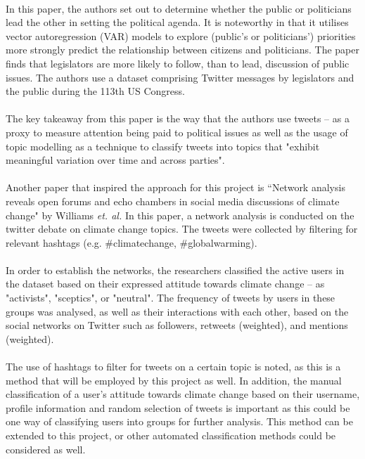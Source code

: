 \documentclass[10pt,twocolumn,letterpaper]{article}
\begin{document}
	\paragraph{} In this paper, the authors set out to determine whether the public or politicians lead the other in setting the political agenda. It is noteworthy in that it utilises vector autoregression (VAR) models to explore  (public's or politicians') priorities more strongly predict the relationship between citizens and politicians. The paper finds that legislators are more likely to follow, than to lead, discussion of public issues. The authors use a dataset comprising Twitter messages by legislators and the public during the 113th US Congress. 
	
	\paragraph{} The key takeaway from this paper is the way that the authors use tweets -- as a proxy to measure attention being paid to political issues as well as the usage of topic modelling as a technique to classify tweets into topics that "exhibit meaningful variation over time and across parties". 
	
	\paragraph{} Another paper that inspired the approach for this project is ``Network analysis reveals open forums and echo chambers in social media discussions of climate change" by Williams \emph{et. al.} \cite{WILLIAMS2015126} In this paper, a network analysis is conducted on the twitter debate on climate change topics. The tweets were collected by filtering for relevant hashtags (e.g. \#climatechange, \#globalwarming). 
	
	\paragraph{} In order to establish the networks, the researchers classified the active users in the dataset based on their expressed attitude towards climate change -- as "activists", "sceptics", or "neutral". The frequency of tweets by users in these groups was analysed, as well as their interactions with each other, based on the social networks on Twitter such as followers, retweets (weighted), and mentions (weighted). 
	
	\paragraph{} The use of hashtags to filter for tweets on a certain topic is noted, as this is a method that will be employed by this project as well. In addition, the manual classification of a user's attitude towards climate change based on their username, profile information and random selection of tweets is important as this could be one way of classifying users into groups for further analysis. This method can be extended to this project, or other automated classification methods could be considered as well. 
	
\end{document}
